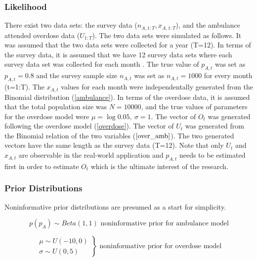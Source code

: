 \documentclass[12pt]{article}
\begin{document}
{\subsubsection{Likelihood}

\normalsize 
There exist two data sets: the survey data ($n_{A,1:T}, x_{A,1:T}$), and the ambulance attended overdose data ($U_{1:T}$). The two data sets were simulated as follows. It was assumed that the two data sets were collected for a year (T=12). In terms of the survey data, it is assumed that  we have 12 survey data sets where each survey data set was collected for each month . The true value of $p_{A,t}$ was set as $p_{A,t}=0.8$ and the survey sample size $n_{A,t}$ was set as $n_{A,t}=1000$ for every month (t=1:T). The $x_{A,t}$ values for each month were independentally generated from the Binomial distribution (\ref{ambulance}).  
In terms of the overdose data, it is assumed that the total population size was $N = 10000$, and the true values of parameters for the overdose model were $\mu=\log0.05,\ \sigma=1$.
The vector of $O_t$ was generated following the overdose model (\ref{overdose}). The vector of $U_t$ was generated from the Binomial relation of the two variables ($\ref{over_amb}$). The two generated vectors have the same length as the survey data (T=12).  Note that only $U_t$ and $x_{A,t}$ are observable in the real-world application and $p_{A,t}$ needs to be estimated first in order to estimate $O_t$ which is the ultimate interest of the research.\\


\subsubsection{Prior Distributions}
\normalsize Noninformative prior distributions are presumed as a start for simplicity. 

\begin{equation}
\label{nonin_prior_amb}
p(p_A) \sim Beta(1,1)
\text{			noninformative prior for ambulance model}
\end{equation} 

\begin{equation}
\label{noninprior_over}
\left.\begin{aligned}
\mu \sim U(-10,0)\\
\sigma \sim U(0,5)
\end{aligned}\right\} 
\text{			noninformative prior for overdose model}
\end{equation}

}
\end{document}
